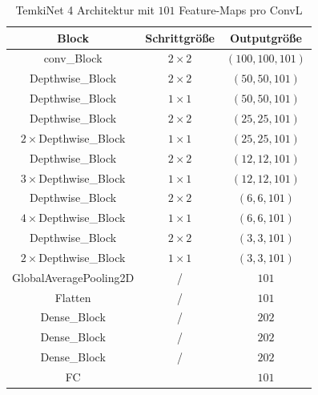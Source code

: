 \documentclass[12pt,a4paper]{scrartcl}
\numberwithin{equation}{section}
\begin{document}
\begin{table}[h!]
	\centering
	\begin{tabular}{|c|c|c|}
		\hline
		Block & Schrittgröße & Outputgröße\\ \hline
		conv\_Block &	$ 2\times2 $ &$ (100,100, 101) $\\ \hline
		Depthwise\_Block & $ 2\times2 $&$ (50,50, 101) $\\ \hline
		Depthwise\_Block & $ 1\times1 $&$ (50,50, 101) $\\ \hline
		
		Depthwise\_Block & $ 2\times2 $&$ (25,25, 101) $\\ \hline
		$ 2\times $Depthwise\_Block & $ 1\times1 $&$ (25,25, 101) $\\ \hline
		
		Depthwise\_Block & $ 2\times2 $&$ (12,12, 101) $\\ \hline
		$ 3\times $Depthwise\_Block & $ 1\times1 $&$ (12,12, 101) $\\ \hline
		
		Depthwise\_Block & $ 2\times2 $&$ (6,6, 101) $\\ \hline
		$ 4\times $Depthwise\_Block & $ 1\times1 $&$ (6,6, 101) $\\ \hline
		
		Depthwise\_Block & $ 2\times2 $&$ (3,3, 101) $\\ \hline
		$ 2\times $Depthwise\_Block & $ 1\times1 $&$ (3,3, 101) $\\ \hline
		GlobalAveragePooling2D & /& $ 101 $\\ \hline
		Flatten & / &$ 101 $ \\ \hline
		Dense\_Block & / &$ 202 $\\ \hline
		Dense\_Block & / &$ 202 $\\ \hline
		Dense\_Block & / &$ 202 $\\ \hline
		FC & & $ 101 $\\ \hline
		
	\end{tabular}
	\caption{TemkiNet 4 Architektur mit $ 101 $ Feature-Maps pro \ac{ConvL}  }
	\label{tab:Temki_Architectur 4}
\end{table}
\end{document}
